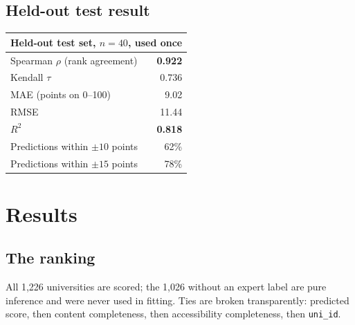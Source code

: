 \documentclass[11pt,a4paper]{article}
\begin{document}
\subsection{Held-out test result}

\begin{table}[H]\centering
\begin{tabular}{lr}
\toprule
\multicolumn{2}{c}{\textbf{Held-out test set, $n = 40$, used once}} \\
\midrule
Spearman $\rho$ (rank agreement) & \textbf{0.922} \\
Kendall $\tau$                   & 0.736 \\
MAE (points on 0--100)           & 9.02 \\
RMSE                             & 11.44 \\
$R^2$                            & \textbf{0.818} \\
\midrule
Predictions within $\pm 10$ points & 62\% \\
Predictions within $\pm 15$ points & 78\% \\
\bottomrule
\end{tabular}
\end{table}

\section{Results}

\subsection{The ranking}

All 1{,}226 universities are scored; the 1{,}026 without an expert label are pure inference and
were never used in fitting. Ties are broken transparently: predicted score, then content
completeness, then accessibility completeness, then \texttt{uni\_id}.
\end{document}
